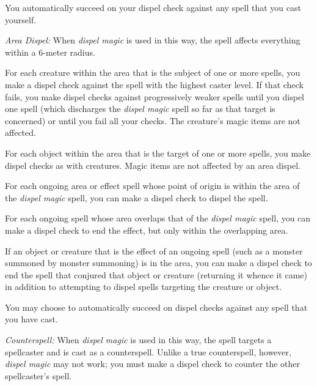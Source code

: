 {	You automatically succeed on your dispel check against any spell that you cast yourself.

	\textit{Area Dispel:}
	When \emph{dispel magic} is used in this way, the spell affects everything within a 6-meter radius.

	For each creature within the area that is the subject of one or more spells, you make a dispel check against the spell with the highest caster level. If that check fails, you make dispel checks against progressively weaker spells until you dispel one spell (which discharges the \emph{dispel magic} spell so far as that target is concerned) or until you fail all your checks. The creature's magic items are not affected.

	For each object within the area that is the target of one or more spells, you make dispel checks as with creatures. Magic items are not affected by an area dispel.

	For each ongoing area or effect spell whose point of origin is within the area of the \emph{dispel magic} spell, you can make a dispel check to dispel the spell.

	For each ongoing spell whose area overlaps that of the \emph{dispel magic} spell, you can make a dispel check to end the effect, but only within the overlapping area.

	If an object or creature that is the effect of an ongoing spell (such as a monster summoned by monster summoning) is in the area, you can make a dispel check to end the spell that conjured that object or creature (returning it whence it came) in addition to attempting to dispel spells targeting the creature or object.

	You may choose to automatically succeed on dispel checks against any spell that you have cast.

	\textit{Counterspell:}
	When \emph{dispel magic} is used in this way, the spell targets a spellcaster and is cast as a counterspell. Unlike a true counterspell, however, \emph{dispel magic} may not work; you must make a dispel check to counter the other spellcaster's spell.

}
